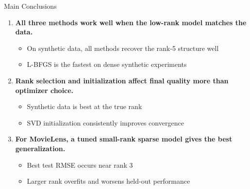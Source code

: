 \documentclass[aspectratio=169,usenames,dvipsnames]{beamer}
\begin{document}
\begin{frame}{Main Conclusions}
    
\begin{enumerate}
    \item \textbf{All three methods work well when the low-rank model matches the data.}
    \begin{itemize}
        \item On synthetic data, all methods recover the rank-5 structure well
        \item L-BFGS is the fastest on dense synthetic experiments
    \end{itemize}
    
    \vspace{0.2cm}
    
    \item \textbf{Rank selection and initialization affect final quality more than optimizer choice.}
    \begin{itemize}
        \item Synthetic data is best at the true rank
        \item SVD initialization consistently improves convergence
    \end{itemize}
    
    \vspace{0.2cm}
    
    \item \textbf{For MovieLens, a tuned small-rank sparse model gives the best generalization.}
    \begin{itemize}
        \item Best test RMSE occurs near rank 3
        \item Larger rank overfits and worsens held-out performance
    \end{itemize}
\end{enumerate}
\end{frame}
\end{document}
